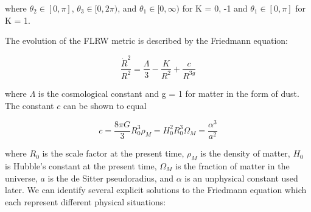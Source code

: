 \documentclass[preprint,notitlepage,amsmath,amssymb,floatfix]{revtex4-1}
\begin{document}
\noindent where $\theta_2\in[0,\pi]$, $\theta_3\in[0,2\pi)$, and $\theta_1\in[0,\infty)$ for K = 0, -1 and $\theta_1\in[0,\pi]$ for K = 1. \par
The evolution of the FLRW metric is described by the Friedmann equation:

\begin{equation}
\frac{\dot{R}^2}{R^2} = \frac{\Lambda}{3} - \frac{K}{R^2} + \frac{c}{R^{3g}}
\end{equation}

\noindent where $\Lambda$ is the cosmological constant and g = 1 for matter in the form of dust.  The constant $c$ can be shown to equal

\begin{equation}
c = \frac{8\pi G}{3}R_0^3\rho_M = H_0^2R_0^3\Omega_M = \frac{\alpha^3}{a^2}
\end{equation}

\noindent where $R_0$ is the scale factor at the present time, $\rho_M$ is the density of matter, $H_0$ is Hubble's constant at the present time, $\Omega_M$ is the fraction of matter in the universe, $a$ is the de Sitter pseudoradius, and $\alpha$ is an unphysical constant used later.  We can identify several explicit solutions to the Friedmann equation which each represent different physical situations:
\end{document}
